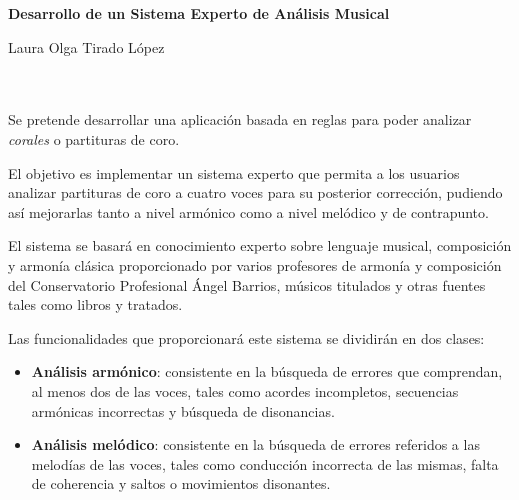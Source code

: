 \thispagestyle{empty}

\begin{center}
{\large\bfseries Desarrollo de un Sistema Experto de Análisis Musical}\\
\end{center}
\begin{center}
Laura Olga Tirado López\\
\end{center}

\\

\vspace{0.7cm}
\\

Se pretende desarrollar una aplicación basada en reglas para poder analizar \textit{corales} o partituras de coro.

\bigskip

El objetivo es implementar un sistema experto que permita a los usuarios analizar partituras de coro a cuatro voces para su posterior corrección, pudiendo así mejorarlas tanto a nivel armónico como a nivel melódico y de contrapunto.

\bigskip

El sistema se basará en conocimiento experto sobre lenguaje musical, composición y armonía clásica proporcionado por varios profesores de armonía y composición del Conservatorio Profesional Ángel Barrios, músicos titulados y otras fuentes tales como libros y tratados. 

\bigskip

Las funcionalidades que proporcionará este sistema se dividirán en dos clases:

\begin{itemize}
	\item \textbf{Análisis armónico}: consistente en la búsqueda de errores que comprendan, al menos dos de las voces, tales como acordes incompletos, secuencias armónicas incorrectas y búsqueda de disonancias.
	\item  \textbf{Análisis melódico}: consistente en la búsqueda de errores referidos a las melodías de las voces, tales como conducción incorrecta de las mismas, falta de coherencia y saltos o movimientos disonantes. 
\end{itemize}

